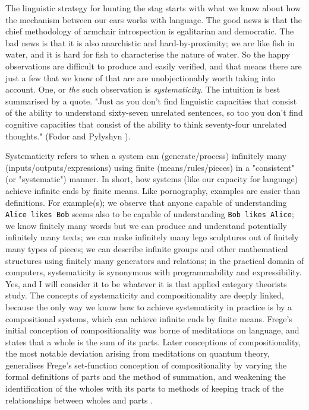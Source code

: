 The linguistic strategy for hunting the stag starts with what we know about how the mechanism between our ears works with language. The good news is that the chief methodology of armchair introspection is egalitarian and democratic. The bad news is that it is also anarchistic and hard-by-proximity; we are like fish in water, and it is hard for fish to characterise the nature of water. So the happy observations are difficult to produce and easily verified, and that means there are just a few that we know of that are are unobjectionably worth taking into account. One, or \emph{the} such observation is \emph{systematicity}. The intuition is best summarised by a quote. "Just as you don't find linguistic capacities that consist of the ability to understand sixty-seven unrelated sentences, so too you don't find cognitive capacities that consist of the ability to think seventy-four unrelated thoughts." (Fodor and Pylyshyn \citep{fodor_connectionism_1988}).

 Systematicity refers to when a system can (generate/process) infinitely many (inputs/outputs/expressions) using finite (means/rules/pieces) in a "consistent" (or "systematic") manner. In short, how systems (like our capacity for language) achieve infinite ends by finite means. Like pornography, examples are easier than definitions. For example(s); we observe that anyone capable of understanding \texttt{Alice likes Bob} seems also to be capable of understanding \texttt{Bob likes Alice}; we know finitely many words but we can produce and understand potentially infinitely many texts; we can make infinitely many lego sculptures out of finitely many types of pieces; we can describe infinite groups and other mathematical structures using finitely many generators and relations; in the practical domain of computers, systematicity is synonymous with programmability and expressibility.\\

 Yes, and I will consider it to be whatever it is that applied category theorists study. The concepts of systematicity and compositionality are deeply linked, because the only way we know how to achieve systematicity in practice is by a compositional systems, which can achieve infinite ends by finite means. Frege's initial conception of compositionality \citep{frege_gottlob_selbst_1884} was borne of meditations on language, and states that a whole is the sum of its parts. Later conceptions of compositionality, the most notable deviation arising from meditations on quantum theory, generalises Frege's set-function conception of compositionality by varying the formal definitions of parts and the method of summation, and weakening the identification of the wholes with its parts to methods of keeping track of the relationships between wholes and parts \citep{coecke_compositionality_2021}.

